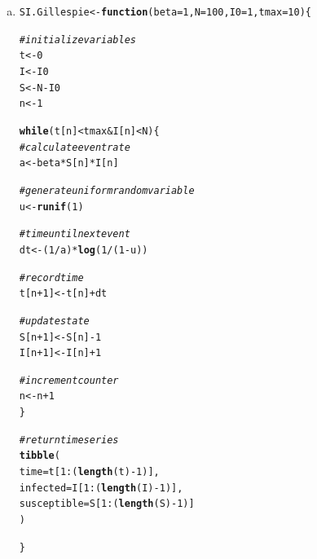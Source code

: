 \documentclass[12pt]{article}\usepackage[]{graphicx}\usepackage[]{color}
\makeatletter
\newcommand{\hlnum}[1]{\textcolor[rgb]{0.686,0.059,0.569}{#1}}%
\newcommand{\hlcom}[1]{\textcolor[rgb]{0.678,0.584,0.686}{\textit{#1}}}%
\newcommand{\hlopt}[1]{\textcolor[rgb]{0,0,0}{#1}}%
\newcommand{\hlstd}[1]{\textcolor[rgb]{0.345,0.345,0.345}{#1}}%
\newcommand{\hlkwa}[1]{\textcolor[rgb]{0.161,0.373,0.58}{\textbf{#1}}}%
\newcommand{\hlkwb}[1]{\textcolor[rgb]{0.69,0.353,0.396}{#1}}%
\newcommand{\hlkwc}[1]{\textcolor[rgb]{0.333,0.667,0.333}{#1}}%
\newcommand{\hlkwd}[1]{\textcolor[rgb]{0.737,0.353,0.396}{\textbf{#1}}}%
\newenvironment{kframe}{%
 \def\at@end@of@kframe{}%
 \ifinner\ifhmode%
  \def\at@end@of@kframe{\end{minipage}}%
  \begin{minipage}{\columnwidth}%
 \fi\fi%
 \def\FrameCommand##1{\hskip\@totalleftmargin \hskip-\fboxsep
 \colorbox{shadecolor}{##1}\hskip-\fboxsep
     \hskip-\linewidth \hskip-\@totalleftmargin \hskip\columnwidth}%
 \MakeFramed {\advance\hsize-\width
   \@totalleftmargin\z@ \linewidth\hsize
   \@setminipage}}%
 {\par\unskip\endMakeFramed%
 \at@end@of@kframe}
\newenvironment{knitrout}{}{} %
\makeatother
\begin{document}
\begin{enumerate}[(a)]

\item \SEa

\begin{knitrout}
\color{fgcolor}\begin{kframe}
\begin{alltt}
\hlstd{SI.Gillespie} \hlkwb{<-} \hlkwa{function}\hlstd{(}\hlkwc{beta} \hlstd{=} \hlnum{1}\hlstd{,} \hlkwc{N} \hlstd{=} \hlnum{100}\hlstd{,} \hlkwc{I0} \hlstd{=} \hlnum{1}\hlstd{,} \hlkwc{tmax}\hlstd{=}\hlnum{10}\hlstd{) \{}

  \hlcom{# initialize variables}
  \hlstd{t} \hlkwb{<-} \hlnum{0}
  \hlstd{I} \hlkwb{<-} \hlstd{I0}
  \hlstd{S} \hlkwb{<-} \hlstd{N} \hlopt{-} \hlstd{I0}
  \hlstd{n} \hlkwb{<-} \hlnum{1}

  \hlkwa{while}\hlstd{(t[n]} \hlopt{<} \hlstd{tmax} \hlopt{&} \hlstd{I[n]} \hlopt{<} \hlstd{N) \{}
    \hlcom{# calculate event rate}
    \hlstd{a} \hlkwb{<-} \hlstd{beta}\hlopt{*}\hlstd{S[n]}\hlopt{*}\hlstd{I[n]}

    \hlcom{# generate uniform random variable}
    \hlstd{u} \hlkwb{<-} \hlkwd{runif}\hlstd{(}\hlnum{1}\hlstd{)}

    \hlcom{# time until next event}
    \hlstd{dt} \hlkwb{<-} \hlstd{(}\hlnum{1}\hlopt{/}\hlstd{a)}\hlopt{*}\hlkwd{log}\hlstd{(}\hlnum{1}\hlopt{/}\hlstd{(}\hlnum{1}\hlopt{-}\hlstd{u))}

    \hlcom{# record time}
    \hlstd{t[n} \hlopt{+} \hlnum{1}\hlstd{]} \hlkwb{<-} \hlstd{t[n]} \hlopt{+} \hlstd{dt}

    \hlcom{# update state}
    \hlstd{S[n}\hlopt{+} \hlnum{1}\hlstd{]} \hlkwb{<-} \hlstd{S[n]} \hlopt{-} \hlnum{1}
    \hlstd{I[n} \hlopt{+} \hlnum{1}\hlstd{]} \hlkwb{<-} \hlstd{I[n]} \hlopt{+} \hlnum{1}

    \hlcom{# increment counter}
    \hlstd{n} \hlkwb{<-} \hlstd{n}\hlopt{+}\hlnum{1}
  \hlstd{\}}

  \hlcom{# return time series}
  \hlkwd{tibble}\hlstd{(}
      \hlkwc{time} \hlstd{= t[}\hlnum{1}\hlopt{:}\hlstd{(}\hlkwd{length}\hlstd{(t)} \hlopt{-} \hlnum{1}\hlstd{)],}
      \hlkwc{infected} \hlstd{= I[}\hlnum{1}\hlopt{:}\hlstd{(}\hlkwd{length}\hlstd{(I)} \hlopt{-} \hlnum{1}\hlstd{)],}
      \hlkwc{susceptible} \hlstd{= S[}\hlnum{1}\hlopt{:}\hlstd{(}\hlkwd{length}\hlstd{(S)} \hlopt{-} \hlnum{1}\hlstd{)]}
  \hlstd{)}

\hlstd{\}}
\end{alltt}
\end{kframe}
\end{knitrout}


\end{enumerate}
\end{document}
